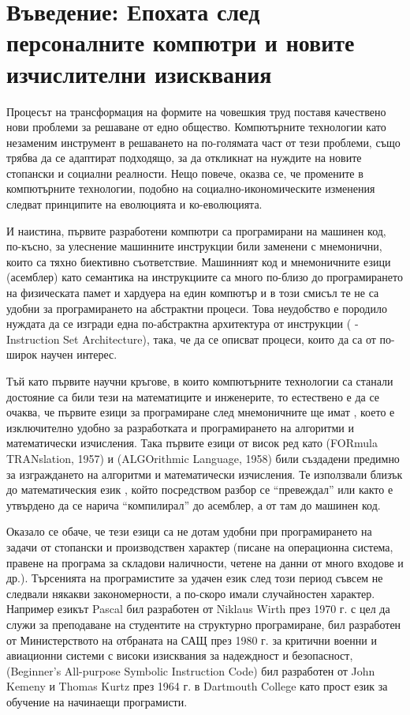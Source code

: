 \section{Въведение: Епохата след персоналните компютри и новите изчислителни изисквания}

Процесът на трансформация на формите на човешкия труд поставя качествено нови проблеми за решаване от едно общество.
Компютърните технологии като незаменим инструмент в решаването на по-голямата част от тези проблеми, също трябва
да се адаптират подходящо, за да откликнат на нуждите на новите стопански и социални реалности.
Нещо повече, оказва се, че промените в компютърните технологии, подобно на социално-икономическите изменения следват
принципите на еволюцията и ко-еволюцията.

И наистина, първите разработени компютри са програмирани на машинен код,
по-късно, за улеснение машинните инструкции били заменени с мнемонични, които са тяхно биективно съответствие.
Машинният код и мнемоничните езици (асемблер) като семантика на инструкциите са много по-близо до програмирането на
физическата памет и хардуера на един компютър и в този смисъл те не са удобни за програмирането на абстрактни процеси.
Това неудобство е породило нуждата да се изгради една по-абстрактна архитектура от инструкции ( - Instruction Set Architecture), така, че
да се описват процеси, които да са от по-широк научен интерес.

Тъй като първите научни кръгове, в които компютърните
технологии са станали достояние са били тези на математиците и инженерите, то естествено е да се очаква, че първите
езици за програмиране след мнемоничните ще имат , което е изключително удобно за разработката и програмирането на
алгоритми и математически изчисления. Така първите езици от висок ред като  (FORmula TRANslation, 1957) и  (ALGOrithmic Language, 1958) били създадени предимно
за изграждането на алгоритми и математически изчисления. Те използвали близък до математическия език , който
посредством разбор се ``превеждал'' или както е утвърдено да се нарича ``компилирал'' до асемблер, а от там до машинен код.

Оказало се обаче, че тези езици са не дотам удобни при програмирането на задачи от стопански и производствен характер
(писане на операционна система, правене на програма за складови наличности, четене на данни от много входове и др.).
Търсенията на програмистите за удачен език след този период съвсем не следвали някакви закономерности, а по-скоро
имали случайностен характер. Например езикът Pascal бил разработен от Niklaus Wirth през 1970 г. с цел да служи за преподаване на студентите на структурно програмиране,
 бил разработен от Министерството на отбраната на САЩ през 1980 г. за критични военни и авиационни системи с високи изисквания за надеждност и безопасност,
 (Beginner's All-purpose Symbolic Instruction Code) бил разработен от John Kemeny и Thomas Kurtz през 1964 г. в Dartmouth College като прост език за обучение на начинаещи програмисти.


